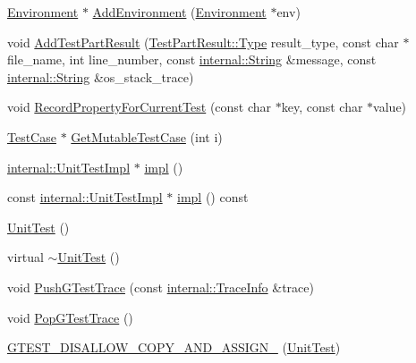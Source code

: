 \begin{DoxyCompactItemize}
\item 
\hyperlink{classtesting_1_1Environment}{\-Environment} $\ast$ \hyperlink{classtesting_1_1UnitTest_a9e3d28bd64badd010a40883e69728f02}{\-Add\-Environment} (\hyperlink{classtesting_1_1Environment}{\-Environment} $\ast$env)
\item 
void \hyperlink{classtesting_1_1UnitTest_a4b89ae9b48ae834488a0831f0bd19e80}{\-Add\-Test\-Part\-Result} (\hyperlink{classtesting_1_1TestPartResult_a1d1cfd8ffb84e947f82999c682b666a7}{\-Test\-Part\-Result\-::\-Type} result\-\_\-type, const char $\ast$file\-\_\-name, int line\-\_\-number, const \hyperlink{classtesting_1_1internal_1_1String}{internal\-::\-String} \&message, const \hyperlink{classtesting_1_1internal_1_1String}{internal\-::\-String} \&os\-\_\-stack\-\_\-trace)
\item 
void \hyperlink{classtesting_1_1UnitTest_aa7b2e142a716c9c6653a6f35a722ec9e}{\-Record\-Property\-For\-Current\-Test} (const char $\ast$key, const char $\ast$value)
\item 
\hyperlink{classtesting_1_1TestCase}{\-Test\-Case} $\ast$ \hyperlink{classtesting_1_1UnitTest_a04b94a3c825711103b247aa87d6b76e3}{\-Get\-Mutable\-Test\-Case} (int i)
\item 
\hyperlink{classtesting_1_1internal_1_1UnitTestImpl}{internal\-::\-Unit\-Test\-Impl} $\ast$ \hyperlink{classtesting_1_1UnitTest_a7fc0e26510d98598fc6632b7e66a281d}{impl} ()
\item 
const \hyperlink{classtesting_1_1internal_1_1UnitTestImpl}{internal\-::\-Unit\-Test\-Impl} $\ast$ \hyperlink{classtesting_1_1UnitTest_a9e09ad1a908343372936c818963a15e0}{impl} () const 
\item 
\hyperlink{classtesting_1_1UnitTest_a3c5dacde37a0ec6c0bf79322f7e355ed}{\-Unit\-Test} ()
\item 
virtual \hyperlink{classtesting_1_1UnitTest_adeb449c651ce08c69e26e519cd109837}{$\sim$\-Unit\-Test} ()
\item 
void \hyperlink{classtesting_1_1UnitTest_a5ea77a45b0cd359476236407bff9bb51}{\-Push\-G\-Test\-Trace} (const \hyperlink{structtesting_1_1internal_1_1TraceInfo}{internal\-::\-Trace\-Info} \&trace)
\item 
void \hyperlink{classtesting_1_1UnitTest_a89acfaaaf4015731b91b26fd8a6f0887}{\-Pop\-G\-Test\-Trace} ()
\item 
\hyperlink{classtesting_1_1UnitTest_ac289f1ec47dc2e475bff4e77364d5571}{\-G\-T\-E\-S\-T\-\_\-\-D\-I\-S\-A\-L\-L\-O\-W\-\_\-\-C\-O\-P\-Y\-\_\-\-A\-N\-D\-\_\-\-A\-S\-S\-I\-G\-N\-\_\-} (\hyperlink{classtesting_1_1UnitTest}{\-Unit\-Test})
\end{DoxyCompactItemize}
